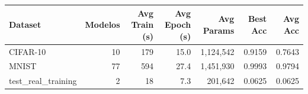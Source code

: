 \begin{tabular}{lrrrrrr}
\toprule
Dataset & Modelos & Avg Train (s) & Avg Epoch (s) & Avg Params & Best Acc & Avg Acc \\
\midrule
CIFAR-10 & 10 & 179 & 15.0 & 1,124,542 & 0.9159 & 0.7643 \\
MNIST & 77 & 594 & 27.4 & 1,451,930 & 0.9993 & 0.9794 \\
test_real_training & 2 & 18 & 7.3 & 201,642 & 0.0625 & 0.0625 \\
\bottomrule
\end{tabular}